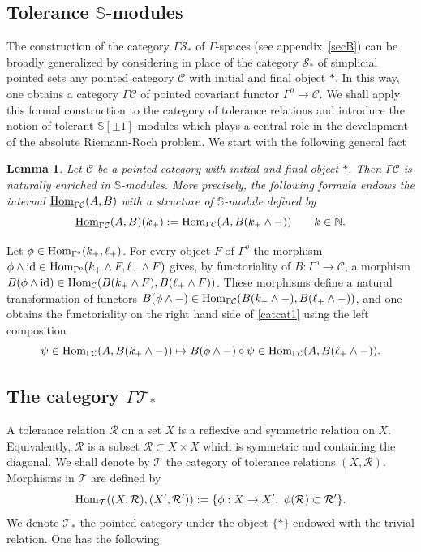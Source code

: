 \documentclass[cupthm]{CUP-JNL-JMJ}
\numberwithin{equation}{section}
\theoremstyle{cupplain}
\newtheorem{lemma}[theorem]{Lemma}
\theoremstyle{cupdefinition}
\theoremstyle{cupremark}
\theoremstyle{cupproof}
\def\N{{\mathbb N}}
\def\S{{\mathbb S}}
\def\cC{{\mathcal C}}
\def\cR{{\mathcal R}}
\def\cS{{\mathcal S}}
\def\cT{{\mathcal T}}
\def\sss{{\S}}
\def\spm{{\sss[\pm 1]}}
\def\Hom {{\rm{Hom}}}
\def\id{{\rm id}}
\def\gop{{\Gamma^{o}}}
\def\uhom{{\underline \Hom}}
\begin{document}
\begin{appendix}

\section{Tolerance $\sss$-modules}\label{secA}

 The construction of the category $\Gamma\cS_*$ of $\Gamma$-spaces (see appendix~\ref{secB}) can be broadly generalized by considering in place of  the category $\cS_*$ of simplicial pointed sets any  pointed category $\cC$ with initial and final object $*$. In this way, one obtains a category $\Gamma\cC$ of pointed covariant functor $\gop \longrightarrow \cC$. We shall apply this formal construction to  the category of tolerance relations and introduce the notion of tolerant $\spm$-modules which plays a central role in the development  of the absolute Riemann-Roch problem.
We start with the following general fact
 
 \begin{lemma}\label{catcat} Let $\cC$ be a pointed category with initial and final object $*$. Then $\Gamma\cC$ is naturally enriched in $\sss$-modules. More  precisely, the following formula endows the internal $\uhom_{\Gamma\cC}(A,B)$ with a structure of $\sss$-module defined by
 \begin{equation}	\label{catcat1}
 	\uhom_{\Gamma\cC}(A,B)(k_+):=\Hom_{\Gamma\cC}(A,B(k_+\wedge -))\qquad k\in\N.
 \end{equation}
 \end{lemma}
\proof Let $\phi\in \Hom_\gop(k_+,\ell_+)$. For every object $F$ of $\gop$ the morphism $\phi \wedge \id\in \Hom_\gop(k_+\wedge F,\ell_+\wedge F)$ gives, by functoriality of $B:\gop \longrightarrow\cC$, a morphism $B(\phi \wedge \id)\in \Hom_\cC(B(k_+\wedge F),B(\ell_+\wedge F))$. These morphisms define a natural transformation of functors $B(\phi\wedge -)\in \Hom_{\Gamma\cC}(B(k_+\wedge -), B(\ell_+\wedge -))$, and one obtains the functoriality on the right hand side of \eqref{catcat1} using the left composition 
\[
\psi\in \Hom_{\Gamma\cC}(A,B(k_+\wedge -))\mapsto B(\phi\wedge -)\circ \psi \in 
\Hom_{\Gamma\cC}(A,B(\ell_+\wedge -)).
\]
 \endproof 
 
  \subsection{The category $\Gamma\cT_*$}\label{gamma-t}

 A tolerance relation $\cR$ on a set $X$ is a reflexive and symmetric relation on  $X$.  Equivalently, $\cR$ is a subset $\cR\subset X\times X$ which is symmetric and containing the diagonal. We shall denote by $\cT$ the category of tolerance relations $(X,\cR)$. Morphisms in  $\cT$  are defined by \[ 
\Hom_\cT((X,\cR),(X',\cR')):=\{	\phi: X \to X', \  \phi(\cR)\subset \cR'\}.
\]
We denote  $\cT_*$ the pointed category under the object $\{\ast\}$ endowed with the trivial relation. One has the following


\end{appendix}
\end{document}
